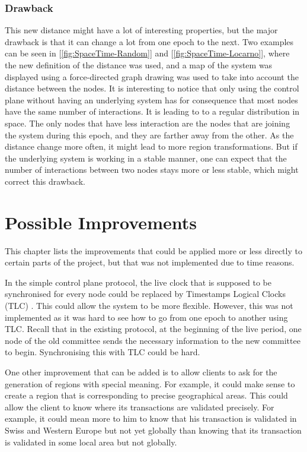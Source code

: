 \documentclass[a4paper,11pt,twoside=semi,openright]{report}
\begin{document}
\subsection{Drawback}
This new distance might have a lot of interesting properties, but the major drawback is that it can change a lot from one epoch to the next. Two examples can be seen in [\autoref{fig:SpaceTime-Random}] and [\autoref{fig:SpaceTime-Locarno}], where the new definition of the distance was used, and a map of the system was displayed using a force-directed graph drawing was used to take into account the distance between the nodes. It is interesting to notice that only using the control plane without having an underlying system has for consequence that most nodes have the same number of interactions. It is leading to to a regular distribution in space. The only nodes that have less interaction are the nodes that are joining the system during this epoch, and they are farther away from the other. As the distance change more often, it might lead to more region transformations. But if the underlying system is working in a stable manner, one can expect that the number of interactions between two nodes stays more or less stable, which might correct this drawback.


\chapter{Possible Improvements} \label{chap:Possible Improvements} %

This chapter lists the improvements that could be applied more or less directly
to certain parts of the project, but that was not implemented due to time reasons. 

In the simple control plane protocol, the live clock that is supposed to be
synchronised for every node could be replaced by Timestamps Logical Clocks (TLC)
\cite{Ford2019}. This could allow the system to be more flexible.
However, this was not implemented as it was hard to see how to go from one
epoch to another using TLC. Recall that in the existing protocol, at the
beginning of the live period, one node of the old committee sends the necessary
information to the new committee to begin. Synchronising this with TLC could be hard.

One other improvement that can be added is to allow clients to ask for the
generation of regions with special meaning. For example, it could make sense to
create a region that is corresponding to precise geographical areas. This could
allow the client to know where its transactions are validated precisely. For
example, it could mean more to him to know that his transaction is validated in
Swiss and Western Europe but not yet globally than knowing that its transaction
is validated in some local area but not globally. 
\end{document}
